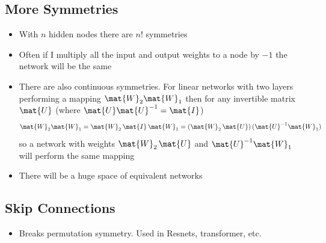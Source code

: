 
\begin{slide}
\section[-2]{More Symmetries}

\begin{PauseHighLight}
  \begin{itemize}
  \item With $n$ hidden nodes there are $n!$ symmetries\pause
  \item Often if I multiply all the input and output weights to a node
    by $-1$ the network will be the same\pause
  \item There are also continuous symmetries.  For linear networks
    with two layers performing a mapping $\mat{W}_2 \mat{W}_1$ then
    for any invertible matrix $\mat{U}$ (where
    $\mat{U}\mat{U}^{-1}=\mat{I}$)
    \begin{align*}
      \mat{W}_2 \mat{W}_1 = \mat{W}_2  \,\mat{I} \, \mat{W}_1
      = (\mat{W}_2 \,\mat{U})\,(\mat{U}^{-1} \mat{W}_1)
    \end{align*}
    so a network with weights $\mat{W}_2 \,\mat{U}$ and
    $\mat{U}^{-1}\mat{W}_1$ will perform the same mapping\pause
  \item There will be a huge space of equivalent networks\pause
  \end{itemize}
\end{PauseHighLight}

\end{slide}


\begin{slide}
  \section[-2]{Skip Connections}

  \pb{}\pause{}
  \begin{center}
    \pause
  \end{center}
  \begin{itemize}
  \item Breaks permutation symmetry\pause. Used in Resnets,
    transformer, etc.\pause
  \end{itemize}
\end{slide}



